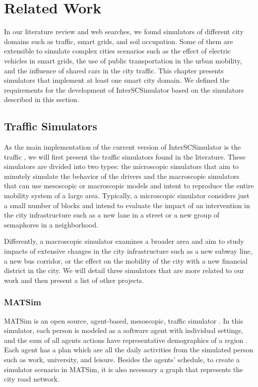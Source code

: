 \chapter{Related Work}
\label{cap:relacionados}

In our literature review and web searches, we found simulators of different city domains such as traffic, smart grids, and soil occupation. Some of them are extensible to simulate complex cities scenarios such as the effect of electric vehicles in smart grids, the use of public transportation in the urban mobility, and the influence of shared cars in the city traffic. This chapter presents simulators that implement at least one smart city domain. We defined the requirements for the development of InterSCSimulator based on the simulators described in this section.

\section{Traffic Simulators}
\label{sec:rel_transito}

As the main implementation of the current version of InterSCSimulator is the traffic , we will first present the traffic simulators found in the literature. These simulators are divided into two types: the microscopic simulators that aim to minutely simulate the behavior of the drivers and the macroscopic simulators that can use mesoscopic or macroscopic models and intent to reproduce the entire mobility system of a large area. Typically, a microscopic simulator considers just a small number of blocks and intend to evaluate the impact of an intervention in the city infrastructure such as a new lane in a street or a new group of semaphores in a neighborhood.

Differently, a macroscopic simulator examines a broader area and aim to study impacts of extensive changes in the city infrastructure such as a new subway line, a new bus corridor, or the effect on the mobility of the city with a new financial district in the city. We will detail three simulators that are more related to our work and then present a list of other projects.

\subsection{MATSim}

MATSim is an open source, agent-based, mesoscopic, traffic simulator \cite{horni2016multi}. In this simulator, each person is modeled as a software agent with individual settings, and the sum of all agents actions have representative demographics of a region \cite{balmer2008agent}. Each agent has a plan which are all the daily activities from the simulated person such as work, university, and leisure. Besides the agents' schedule, to create a simulator scenario in MATSim, it is also necessary a graph that represents the city road network. 

